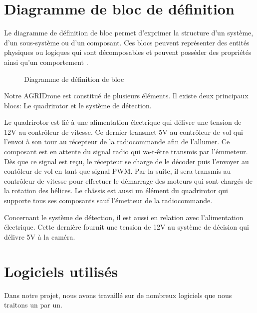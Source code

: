 	\section[D.définition de bloc]{Diagramme de bloc de définition  }
	
Le diagramme de définition de bloc permet d'exprimer la structure d'un système, d'un sous-système ou d'un composant. Ces blocs peuvent représenter des entités physiques ou logiques qui sont décomposables et peuvent posséder des propriétés ainsi qu'un comportement \cite{siloged}.


\begin{figure}[H] 
	\begin{center} 
		\centering
		\hspace*{-3.5cm}	
	\end{center}
	
	\caption{Diagramme de définition de bloc}
	
	\end {figure}
	Notre AGRIDrone  est constitué de plusieurs éléments. Il existe deux principaux blocs: Le quadrirotor et le système de détection.
	
	Le quadrirotor est lié à une alimentation électrique qui  délivre une tension de 12V au contrôleur de vitesse. Ce dernier transmet 5V au contrôleur de vol qui l'envoi à son tour au récepteur de la radiocommande afin de l'allumer. Ce composant est en attente du signal radio qui va-t-être transmis par l'émmeteur. Dès que ce signal est reçu, le récepteur se charge de le décoder puis l'envoyer au contôleur de vol en tant que signal PWM. Par la suite, il sera transmis au contrôleur de vitesse pour effectuer le démarrage des moteurs qui sont chargés de la rotation des hélices. Le châssis est aussi un élément du quadrirotor qui supporte tous ses composants sauf l'émetteur de la radiocommande.
	
	Concernant le système de détection, il est aussi en relation avec l'alimentation électrique. Cette dernière fournit une tension de 12V au système de décision qui délivre 5V à la caméra.
	\section{Logiciels utilisés}
	Dans notre projet, nous avons travaillé sur de nombreux logiciels que nous traitons un par un.
